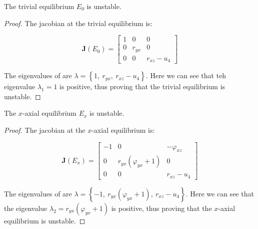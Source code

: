 \begin{theorem}\label{thm:eq-trivial-stability}
    The trivial equilibrium $E_0$ is unstable.
\end{theorem}
\begin{proof}
    The jacobian at the trivial equilibrium is:

    \begin{equation}\label{matrix:jacobian-trivial}
        \textbf{J}\left(E_0\right) = \begin{bmatrix}
            1 & 0 & 0\\
            0 & r_{yx} & 0\\
            0 & 0 & r_{xz}-u_4
        \end{bmatrix}
    \end{equation}

    The eigenvalues of  are $\lambda=\left\{1,\ r_{yx},\ r_{xz}-u_4\right\}$. Here we can see that teh eigenvalue $\lambda_1=1$ is positive, thus proving that the trivial equilibrium is unstable.
\end{proof}

\begin{theorem}\label{thm:eq-axial-x-stability}
    The $x$-axial equilibrium $E_x$ is unstable.
\end{theorem}
\begin{proof}
    The jacobian at the $x$-axial equilibrium is:

    \begin{equation}\label{matrix:jacobian-axial-x}
        \textbf{J}\left(E_x\right) = \begin{bmatrix}
            -1 & 0 & -\varphi_{xz}\\
            0 & r_{yx}\left(\varphi_{yx}+1\right) & 0\\
            0 & 0 & r_{xz}-u_4
        \end{bmatrix}
    \end{equation}

    The eigenvalues of  are $\lambda=\left\{-1,\ r_{yx}\left(\varphi_{yx}+1\right),\ r_{xz}-u_4\right\}$. Here we can see that the eigenvalue $\lambda_2=r_{yx}\left(\varphi_{yx}+1\right)$ is positive, thus proving that the $x$-axial equilibrium is unstable.
\end{proof}

